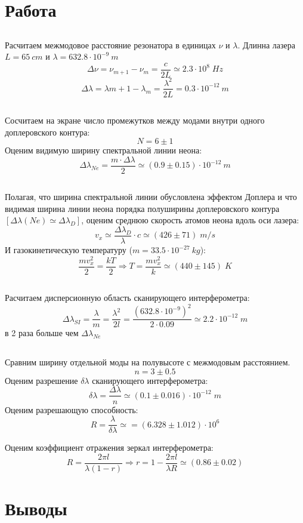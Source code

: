 \documentclass{article}
\begin{document}
\section{Работа}
\subsection{}
Расчитаем межмодовое расстояние резонатора в единицах \(\nu\) и \(\lambda\). Длинна лазера \(L = 65\:cm\)
и \(\lambda = 632.8\cdot 10^{-9}\:m \)
\[ \Delta\nu = \nu_{m+1} - \nu_m = \frac{c}{2L} \simeq 2.3\cdot10^8\; Hz\]
\[ \Delta\lambda = \lambda{m+1} - \lambda_m = \frac{\lambda^2}{2L} = 0.3\cdot 10^{-12}\:m \]

\subsection{}
Сосчитаем на экране число промежутков между модами внутри одного доплеровского контура:
\[ N = 6 \pm 1 \]
Оценим видимую ширину спектральной линии неона:
\[ \Delta\lambda_{Ne} = \frac{m\cdot\Delta\lambda }{2} \simeq \left( 0.9 \pm 0.15  \right)\cdot 10^{-12}\:m \]  

\subsection{}
Полагая, что ширина спектральной линии обусловлена эффектом Доплера и что видимая ширина линии неона
порядка полуширины доплеровского контура 
\(\left[\Delta\lambda\left(Ne\right) \simeq \Delta\lambda_D\right]\), оценим среднюю скорость атомов 
неона вдоль оси лазера:
\[ v_x \simeq \frac{\Delta\lambda_D}{\lambda}\cdot c \simeq \left( 426 \pm 71 \right)\; m/s \]
И газокинетическую температуру (\( m = 33.5\cdot 10^{-27}\: kg\)):
\[ \frac{mv_x^2}{2} = \frac{kT}{2} \Rightarrow T = \frac{mv_x^2}{k} \simeq  \left(440 \pm 145 \right)\;K  \]

\subsection{}
Расчитаем дисперсионную область сканирующего интерферометра:
\[ \Delta\lambda_{SI} = \frac{\lambda}{m} = \frac{\lambda^2}{2l} = 
\frac{\left(632.8\cdot 10^{-9}\right)^2}{2 \cdot 0.09} \simeq 2.2\cdot 10^{-12}\;m  \]
в 2 раза больше чем \(\Delta\lambda_{Ne}\)

\subsection{}
Сравним ширину отдельной моды на полувысоте с межмодовым расстоянием. 
\[ n = 3 \pm 0.5 \]
Оценим разрешение \(\delta\lambda\) сканирующего интерферометра:
\[ \delta\lambda = \frac{\Delta\lambda}{n} \simeq \left(0.1 \pm 0.016\right)\cdot 10^{-12}\;m \]
Оценим разрешающую способность:
\[ R = \frac{\lambda}{\delta\lambda} \simeq = \left(6.328 \pm 1.012 \right)\cdot 10^6 \]

Оценим коэффициент отражения  зеркал интерферометра:
\[ R = \frac{2\pi l}{\lambda(1-r)} \Rightarrow r = 1 - \frac{2\pi l}{\lambda R} \simeq \left(0.86 \pm 0.02 \right) \]


\section{Выводы}
\end{document}
